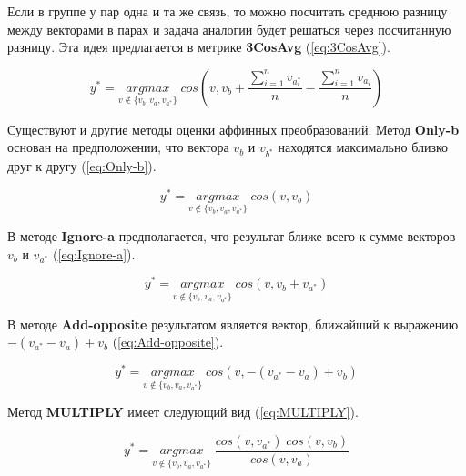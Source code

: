 \documentclass[a4paper,14pt]{article}
\begin{document}
	Если в группе у пар одна и та же связь, то можно посчитать среднюю разницу между векторами в парах и задача аналогии будет решаться через посчитанную разницу.
	Эта идея предлагается в метрике	\textbf{3CosAvg} (\ref{eq:3CosAvg}).
	
	\begin{equation}
		y^* = \underset{v \notin \{v_b, v_a, v_{a^*}\}}{argmax} \; cos(v,v_b + \dfrac{\sum_{i=1}^{n}v_{a_i^*}}{n} - \dfrac{\sum_{i=1}^{n}v_{a_i}}{n})
		\label{eq:3CosAvg}
	\end{equation}
	
	Существуют и другие методы оценки аффинных преобразований.
	Метод \textbf{Only-b} основан на предположении, что вектора $v_b$ и $v_{b^*}$ находятся максимально близко друг к другу (\ref{eq:Only-b}).
	
	\begin{equation}
		y^* = \underset{v \notin \{v_b, v_a, v_{a^*}\}}{argmax} \; cos(v, v_b)
		\label{eq:Only-b}
	\end{equation}

	В методе \textbf{Ignore-a} предполагается, что результат ближе всего к сумме векторов $v_b$ и $v_{a^*}$ (\ref{eq:Ignore-a}).
	
	\begin{equation}
		y^* = \underset{v \notin \{v_b, v_a, v_{a^*}\}}{argmax} \; cos(v, v_b + v_{a^*})
		\label{eq:Ignore-a}
	\end{equation}

	В методе \textbf{Add-opposite} результатом является вектор, ближайший к выражению $-(v_{a^*} - v_a) + v_b$ (\ref{eq:Add-opposite}).

	\begin{equation}
		y^* = \underset{v \notin \{v_b, v_a, v_{a^*}\}}{argmax} \; cos(v, -(v_{a^*} - v_a) + v_b)
		\label{eq:Add-opposite}
	\end{equation}

	Метод \textbf{MULTIPLY} имеет следующий вид (\ref{eq:MULTIPLY}).
	
	\begin{equation}
		y^* = \underset{v \notin \{v_b, v_a, v_{a^*}\}}{argmax} \; \dfrac{cos(v, v_{a^*}) \; cos(v, v_b)}{cos(v, v_a)}
		\label{eq:MULTIPLY}
	\end{equation}
	
	
\end{document}
